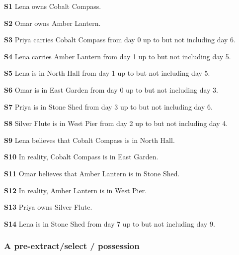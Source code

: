 \noindent\textbf{S1} Lena owns Cobalt Compass.\par\smallskip

\noindent\textbf{S2} Omar owns Amber Lantern.\par\smallskip

\noindent\textbf{S3} Priya carries Cobalt Compass from day 0 up to but not including day 6.\par\smallskip

\noindent\textbf{S4} Lena carries Amber Lantern from day 1 up to but not including day 5.\par\smallskip

\noindent\textbf{S5} Lena is in North Hall from day 1 up to but not including day 5.\par\smallskip

\noindent\textbf{S6} Omar is in East Garden from day 0 up to but not including day 3.\par\smallskip

\noindent\textbf{S7} Priya is in Stone Shed from day 3 up to but not including day 6.\par\smallskip

\noindent\textbf{S8} Silver Flute is in West Pier from day 2 up to but not including day 4.\par\smallskip

\noindent\textbf{S9} Lena believes that Cobalt Compass is in North Hall.\par\smallskip

\noindent\textbf{S10} In reality, Cobalt Compass is in East Garden.\par\smallskip

\noindent\textbf{S11} Omar believes that Amber Lantern is in Stone Shed.\par\smallskip

\noindent\textbf{S12} In reality, Amber Lantern is in West Pier.\par\smallskip

\noindent\textbf{S13} Priya owns Silver Flute.\par\smallskip

\noindent\textbf{S14} Lena is in Stone Shed from day 7 up to but not including day 9.\par\smallskip

\subsubsection*{A pre-extract/select / possession}

